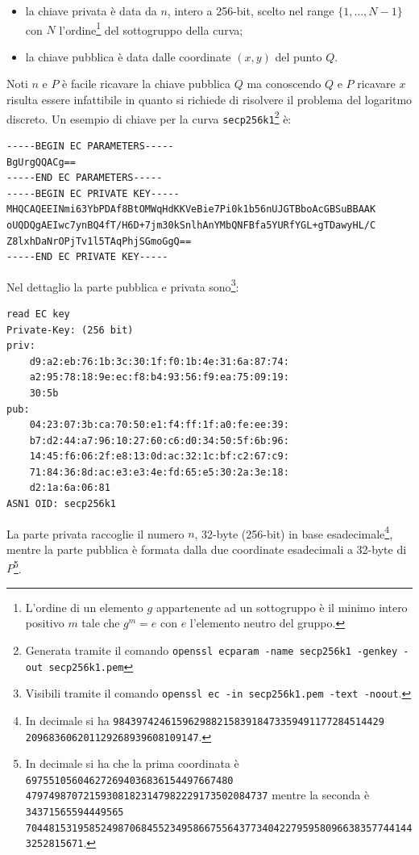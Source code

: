 \begin{itemize}
    \item la chiave privata è data da $n$, intero a 256-bit, scelto nel range $\{1,...,N-1\}$ con $N$ l'ordine\footnote{L'ordine di un elemento $g$ appartenente ad un sottogruppo è il minimo intero positivo $m$ tale che $g^m=e$ con $e$ l'elemento neutro del gruppo.} del sottogruppo della curva;
    \item la chiave pubblica è data dalle coordinate $(x,y)$ del punto $Q$.
\end{itemize}

Noti $n$ e $P$ è facile ricavare la chiave pubblica $Q$ ma conoscendo $Q$ e $P$ ricavare $x$ risulta essere infattibile in quanto si richiede di risolvere il problema del logaritmo discreto.\newline\newline
Un esempio di chiave per la curva \texttt{secp256k1}\footnote{Generata tramite il comando \texttt{openssl ecparam -name secp256k1 -genkey -out secp256k1.pem}} è:
\begin{lstlisting}[frame=none]
-----BEGIN EC PARAMETERS-----
BgUrgQQACg==
-----END EC PARAMETERS-----
-----BEGIN EC PRIVATE KEY-----
MHQCAQEEINmi63YbPDAf8BtOMWqHdKKVeBie7Pi0k1b56nUJGTBboAcGBSuBBAAK
oUQDQgAEIwc7ynBQ4fT/H6D+7jm30kSnlhAnYMbQNFBfa5YURfYGL+gTDawyHL/C
Z8lxhDaNrOPjTv1l5TAqPhjSGmoGgQ==
-----END EC PRIVATE KEY-----
\end{lstlisting}
Nel dettaglio la parte pubblica e privata sono\footnote{Visibili tramite il comando \texttt{openssl ec -in secp256k1.pem -text -noout}.}:
\begin{lstlisting}[frame=none]
read EC key
Private-Key: (256 bit)
priv:
    d9:a2:eb:76:1b:3c:30:1f:f0:1b:4e:31:6a:87:74:
    a2:95:78:18:9e:ec:f8:b4:93:56:f9:ea:75:09:19:
    30:5b
pub:
    04:23:07:3b:ca:70:50:e1:f4:ff:1f:a0:fe:ee:39:
    b7:d2:44:a7:96:10:27:60:c6:d0:34:50:5f:6b:96:
    14:45:f6:06:2f:e8:13:0d:ac:32:1c:bf:c2:67:c9:
    71:84:36:8d:ac:e3:e3:4e:fd:65:e5:30:2a:3e:18:
    d2:1a:6a:06:81
ASN1 OID: secp256k1
\end{lstlisting}
La parte privata raccoglie il numero $n$, 32-byte (256-bit) in base esadecimale\footnote{In decimale si ha \texttt{98439742461596298821583918473359491177284514429\\209683606201129268939608109147}.}, mentre la parte pubblica è formata dalla due coordinate esadecimali a 32-byte di $P$\footnote{In decimale si ha che la prima coordinata è  \texttt{697551056046272694036836154497667480\\479749870721593081823147982229173502084737} mentre la seconda è \texttt{34371565594449565\\70448153195852498706845523495866755643773404227959580966383577441443252815671}.}.\newline
